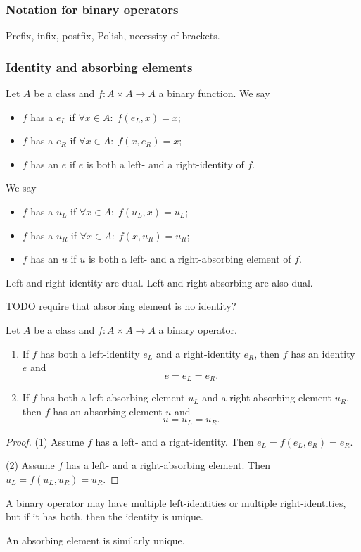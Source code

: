 \subsubsection{Notation for binary operators}
Prefix, infix, postfix, Polish, necessity of brackets.

\subsubsection{Identity and absorbing elements}
\begin{definition}
Let $A$ be a class and $f: A\times A \to A$ a binary function. 
We say
\begin{itemize}
\item $f$ has a  $e_L$ if $\forall x\in A:\; f(e_L, x) = x$;
\item $f$ has a  $e_R$ if $\forall x\in A:\; f(x, e_R) = x$;
\item $f$ has an  $e$ if $e$ is both a left- and a right-identity of $f$.
\end{itemize}
We say
\begin{itemize}
\item $f$ has a  $u_L$ if $\forall x\in A:\; f(u_L, x) = u_L$;
\item $f$ has a  $u_R$ if $\forall x\in A:\; f(x, u_R) = u_R$;
\item $f$ has an  $u$ if $u$ is both a left- and a right-absorbing element of $f$.
\end{itemize}
\end{definition}

Left and right identity are dual. Left and right absorbing are also dual.

TODO require that absorbing element is no identity?

\begin{lemma} \label{leftRightIdentity}
Let $A$ be a class and $f: A\times A \to A$ a binary operator.
\begin{enumerate}
\item If $f$ has both a left-identity $e_L$ and a right-identity $e_R$, then $f$ has an identity $e$ and
\[ e = e_L = e_R. \]
\item If $f$ has both a left-absorbing element $u_L$ and a right-absorbing element $u_R$, then $f$ has an absorbing element $u$ and
\[ u = u_L = u_R. \]
\end{enumerate}
\end{lemma}
\begin{proof}
(1) Assume $f$ has a left- and a right-identity. Then $e_L = f(e_L, e_R) = e_R$.

(2) Assume $f$ has a left- and a right-absorbing element. Then $u_L = f(u_L, u_R) = u_R$.
\end{proof}
\begin{corollary}
A binary operator may have multiple left-identities or multiple right-identities, but if it has both, then the identity is unique.

An absorbing element is similarly unique.
\end{corollary}

